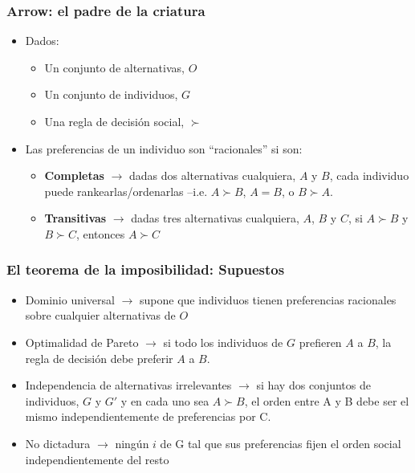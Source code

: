 \documentclass[14pt,aspectratio=169]{beamer}
\begin{document}
\begin{frame}\frametitle{Arrow: el padre de la criatura}
\begin{itemize}
\item Dados:
\begin{itemize}
\item Un conjunto de alternativas, $O$
\item Un conjunto de individuos, $G$
\item Una regla de decisión social, $\succ$
\end{itemize}
\item Las preferencias de un individuo son ``racionales'' si son:
\begin{itemize}\itemsep 5pt \medskip
\item \textbf{Completas} $\longrightarrow$ dadas dos alternativas
  cualquiera, $A$ y $B$, cada individuo puede rankearlas/ordenarlas
  --i.e. $A \succ B$, $A=B$, o $B \succ A$.
\item \textbf{Transitivas} $\longrightarrow$ dadas tres alternativas
  cualquiera, $A$, $B$ y $C$, si $A \succ B$ y $B \succ C$, entonces
  $A \succ C$
\end{itemize}
\end{itemize}
\end{frame}

\begin{frame}\frametitle{El teorema de la imposibilidad: Supuestos}
\begin{itemize}
\item Dominio universal $\longrightarrow$ supone que  individuos
  tienen preferencias racionales sobre cualquier alternativas de $O$
\item Optimalidad de Pareto $\longrightarrow$ si todo los individuos
  de $G$ prefieren $A$ a $B$, la regla de decisión debe
  preferir $A$ a $B$.
\item Independencia de alternativas irrelevantes $\longrightarrow$ si
  hay dos conjuntos de individuos, $G$ y $G'$ y en cada uno sea $A
  \succ B$, el orden entre A y B debe ser el mismo independientemente
  de preferencias por C.
\item No dictadura $\longrightarrow$ ningún $i$ de G tal que sus
  preferencias fijen el orden social independientemente del resto
\end{itemize}
\end{frame}
\end{document}
